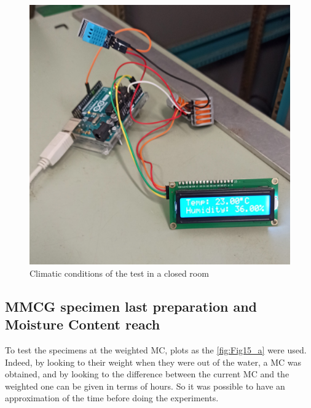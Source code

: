 \begin{figure}[t]
	\centering
	\includegraphics[scale=0.08]{Figures/Temperature_ relative_humidity}
	\decoRule
	\caption[Climatic conditions of the test]{Climatic conditions of the test in a closed room}
	\label{fig:Fig19}
\end{figure}

\subsection{MMCG specimen last preparation and Moisture Content reach}
To test the specimens at the weighted MC, plots as the \ref{fig:Fig15_a} were used. Indeed, by looking to their weight when they were out of the water, a MC was obtained, and by looking to the difference between the current MC and the weighted one can be given in terms of hours. So it was possible to have an approximation of the time before doing the experiments.

